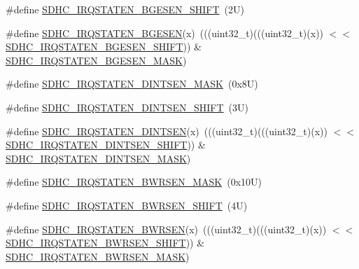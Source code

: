 \begin{DoxyCompactItemize}
\item 
\#define \mbox{\hyperlink{group___s_d_h_c___register___masks_ga6fa2e791021ce11cf32108b91c82ba6e}{S\+D\+H\+C\+\_\+\+I\+R\+Q\+S\+T\+A\+T\+E\+N\+\_\+\+B\+G\+E\+S\+E\+N\+\_\+\+S\+H\+I\+FT}}~(2\+U)
\item 
\#define \mbox{\hyperlink{group___s_d_h_c___register___masks_ga120fd3e99b27fbbfd6c0506c7961dd0f}{S\+D\+H\+C\+\_\+\+I\+R\+Q\+S\+T\+A\+T\+E\+N\+\_\+\+B\+G\+E\+S\+EN}}(x)~(((uint32\+\_\+t)(((uint32\+\_\+t)(x)) $<$$<$ \mbox{\hyperlink{group___s_d_h_c___register___masks_ga6fa2e791021ce11cf32108b91c82ba6e}{S\+D\+H\+C\+\_\+\+I\+R\+Q\+S\+T\+A\+T\+E\+N\+\_\+\+B\+G\+E\+S\+E\+N\+\_\+\+S\+H\+I\+FT}})) \& \mbox{\hyperlink{group___s_d_h_c___register___masks_ga46d5c9b348b825831e0fb397ede43a9a}{S\+D\+H\+C\+\_\+\+I\+R\+Q\+S\+T\+A\+T\+E\+N\+\_\+\+B\+G\+E\+S\+E\+N\+\_\+\+M\+A\+SK}})
\item 
\#define \mbox{\hyperlink{group___s_d_h_c___register___masks_ga3e226429fe18b447810a75373b0e4e80}{S\+D\+H\+C\+\_\+\+I\+R\+Q\+S\+T\+A\+T\+E\+N\+\_\+\+D\+I\+N\+T\+S\+E\+N\+\_\+\+M\+A\+SK}}~(0x8\+U)
\item 
\#define \mbox{\hyperlink{group___s_d_h_c___register___masks_ga7a2afc379b13fa392c324274ccf3c313}{S\+D\+H\+C\+\_\+\+I\+R\+Q\+S\+T\+A\+T\+E\+N\+\_\+\+D\+I\+N\+T\+S\+E\+N\+\_\+\+S\+H\+I\+FT}}~(3\+U)
\item 
\#define \mbox{\hyperlink{group___s_d_h_c___register___masks_gac8d632854fc5bd8e72b089e87d4c686b}{S\+D\+H\+C\+\_\+\+I\+R\+Q\+S\+T\+A\+T\+E\+N\+\_\+\+D\+I\+N\+T\+S\+EN}}(x)~(((uint32\+\_\+t)(((uint32\+\_\+t)(x)) $<$$<$ \mbox{\hyperlink{group___s_d_h_c___register___masks_ga7a2afc379b13fa392c324274ccf3c313}{S\+D\+H\+C\+\_\+\+I\+R\+Q\+S\+T\+A\+T\+E\+N\+\_\+\+D\+I\+N\+T\+S\+E\+N\+\_\+\+S\+H\+I\+FT}})) \& \mbox{\hyperlink{group___s_d_h_c___register___masks_ga3e226429fe18b447810a75373b0e4e80}{S\+D\+H\+C\+\_\+\+I\+R\+Q\+S\+T\+A\+T\+E\+N\+\_\+\+D\+I\+N\+T\+S\+E\+N\+\_\+\+M\+A\+SK}})
\item 
\#define \mbox{\hyperlink{group___s_d_h_c___register___masks_gab61d7d78bdcc89f1ae03332eae100736}{S\+D\+H\+C\+\_\+\+I\+R\+Q\+S\+T\+A\+T\+E\+N\+\_\+\+B\+W\+R\+S\+E\+N\+\_\+\+M\+A\+SK}}~(0x10\+U)
\item 
\#define \mbox{\hyperlink{group___s_d_h_c___register___masks_ga8d3fbb4324645ec6117b77a592000680}{S\+D\+H\+C\+\_\+\+I\+R\+Q\+S\+T\+A\+T\+E\+N\+\_\+\+B\+W\+R\+S\+E\+N\+\_\+\+S\+H\+I\+FT}}~(4\+U)
\item 
\#define \mbox{\hyperlink{group___s_d_h_c___register___masks_ga7b21b76bd59976193b2500ade93eadd8}{S\+D\+H\+C\+\_\+\+I\+R\+Q\+S\+T\+A\+T\+E\+N\+\_\+\+B\+W\+R\+S\+EN}}(x)~(((uint32\+\_\+t)(((uint32\+\_\+t)(x)) $<$$<$ \mbox{\hyperlink{group___s_d_h_c___register___masks_ga8d3fbb4324645ec6117b77a592000680}{S\+D\+H\+C\+\_\+\+I\+R\+Q\+S\+T\+A\+T\+E\+N\+\_\+\+B\+W\+R\+S\+E\+N\+\_\+\+S\+H\+I\+FT}})) \& \mbox{\hyperlink{group___s_d_h_c___register___masks_gab61d7d78bdcc89f1ae03332eae100736}{S\+D\+H\+C\+\_\+\+I\+R\+Q\+S\+T\+A\+T\+E\+N\+\_\+\+B\+W\+R\+S\+E\+N\+\_\+\+M\+A\+SK}})
$$
\end{DoxyCompactItemize}
